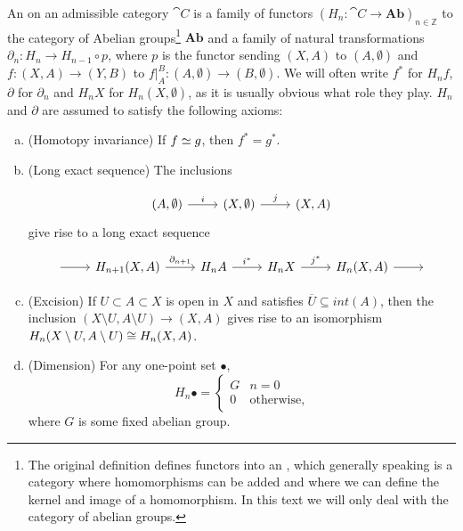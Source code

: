 \begin{definition}
An  on an admissible category $\cat{C}$ is a family of functors $(H_n:\cat{C}\rightarrow \mathbf{Ab})_{n \in\mathbb{Z}}$ to the category of Abelian groups\footnote{The original definition defines functors into an , which generally speaking is a category where homomorphisms can be added and where we can define the kernel and image of a homomorphism. In this text we will only deal with the category of abelian groups.} $\mathbf{Ab}$ and a family of natural transformations $\partial_n:H_n\rightarrow H_{n-1}\circ p$, where $p$ is the functor sending $(X,A)$ to $(A,\emptyset)$ and $f:(X,A)\rightarrow (Y,B)$ to $f|_A^B:(A,\emptyset)\rightarrow(B,\emptyset)$. We will often write $f^*$ for $H_n f$, $\partial$ for $\partial_n$ and $H_nX$ for $H_n(X,\emptyset)$, as it is usually obvious what role they play. $H_n$ and $\partial$ are assumed to satisfy the following axioms:

\begin{enumerate}[(a)]
\item (Homotopy invariance) If $f\simeq g$, then $f^*=g^*$.
\item (Long exact sequence) The inclusions 

\[\begin{tikzcd}
{(A,\emptyset)} \arrow[r, "i"] & {(X,\emptyset)} \arrow[r, "j"] & {(X,A)}
\end{tikzcd}\]
give rise to a long exact sequence

\[\begin{tikzcd}
{} \arrow[r] & {H_{n+1}(X,A)} \arrow[r, "\partial_{n+1}"] & H_nA \arrow[r, "i^*"] & H_nX \arrow[r, "j^*"] & {H_n(X,A)} \arrow[r] & {}
\end{tikzcd}\]

\item (Excision) If $U\subset A\subset X$ is open in $X$ and satisfies $\overline{U}\subseteq int(A)$, then the inclusion $(X\setminus U,A\setminus U)\rightarrow (X,A)$ gives rise to an isomorphism $H_n(X\setminus U,A\setminus U)\cong H_n(X,A)$.
\item (Dimension) For any one-point set $\bullet$, $$H_n\bullet=\begin{cases}G & n=0\\0&\text{otherwise},\end{cases}$$ where $G$ is some fixed abelian group.
\end{enumerate}
\end{definition}


